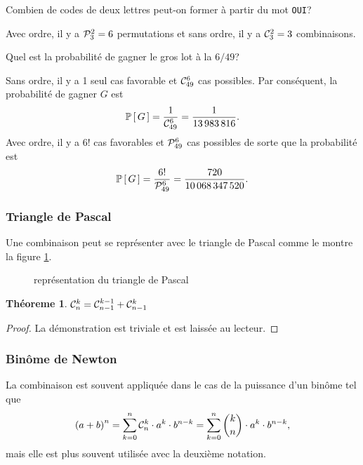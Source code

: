 \documentclass[11pt]{article}
\newcommand\comb[2]{%
	\ensuremath{%
		\mathcal{C}_{#2}^{#1}%
	}%
}%
\newcommand\perm[2]{%
	\ensuremath{%
		\mathcal{P}_{#2}^{#1}%
	}%
}%
\renewcommand\P[1]{%
	\ensuremath{%
		\mathbb{P}\left[\,#1\,\right]%
	}%
}%
\newtheorem{theoreme}{Théoreme}[section]
\begin{document}
\begin{exemple}
	Combien de codes de deux lettres peut-on former à partir du mot
	\texttt{OUI}?
	
	Avec ordre, il y a $\perm{2}{3}=6$ permutations et sans ordre, il y a
	$\comb{2}{3}=3$ combinaisons.
\end{exemple}

\begin{exemple}
	Quel est la probabilité de gagner le gros lot à la $6/49$?
	
	Sans ordre, il y a 1 seul cas favorable et $\comb{6}{49}$ cas possibles.
	Par conséquent, la probabilité de gagner $G$ est
	\begin{equation*}
		\P{G}=\frac{1}{\comb{6}{49}}=\frac{1}{\SI{13983816}{}}.
	\end{equation*}
	Avec ordre, il y a $6!$ cas favorables et $\perm{6}{49}$ cas possibles de
	sorte que la probabilité est
	\begin{equation*}
		\P{G}=\frac{6!}{\perm{6}{49}}=\frac{720}{\SI{10068347520}{}}.
	\end{equation*}
\end{exemple}

\subsubsection{Triangle de Pascal}
Une combinaison peut se représenter avec le triangle de Pascal comme le montre
la figure \ref{fig:pascal}.

\begin{figure}[H]
	\centering
	
	\caption{représentation du triangle de Pascal}
	\label{fig:pascal}
\end{figure}

\begin{theoreme}
	$\comb{k}{n}=\comb{k-1}{n-1}+\comb{k}{n-1}$
\end{theoreme}

\begin{proof}
	La démonstration est triviale et est laissée au lecteur.
\end{proof}

\subsubsection{Binôme de Newton}
La combinaison est souvent appliquée dans le cas de la puissance d'un binôme
tel que
\begin{equation*}
	\left(a+b\right)^n
	=\sum_{k=0}^n\comb{k}{n}\cdot a^k\cdot b^{n-k}
	=\sum_{k=0}^n{{k}\choose{n}}\cdot a^k\cdot b^{n-k},
\end{equation*}
mais elle est plus souvent utilisée avec la deuxième notation.
\end{document}
